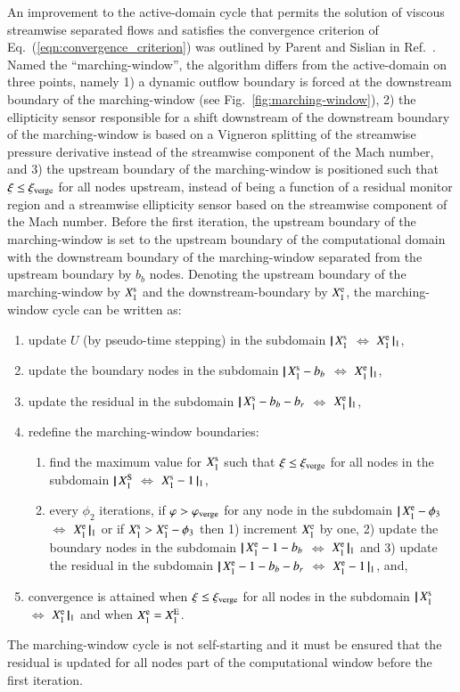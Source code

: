 \documentclass{warpdoc}
\newcommand{\bb}{{b_b}}
\newcommand{\br}{{b_r}}
\newcommand{\loope}{{\rm e}}
\newcommand{\loops}{{\rm s}}
\newcommand{\loopE}{{\rm E}}
\newcommand{\loopS}{{\rm S}}
\newcommand{\xiverge}{{\xi_{\rm verge}}}
\newcommand{\varphiverge}{{\varphi_{\rm verge}}}
\newcommand\subdomain[3]{$ | \! | \, #2 $ $\Leftrightarrow$ $#3 \, | \! |_{#1}$}
\begin{document}
An improvement to the active-domain cycle
that permits the solution of viscous streamwise separated flows and satisfies the
convergence criterion of Eq.~(\ref{eqn:convergence_criterion}) was outlined by Parent and Sislian in Ref.\ \cite{jcp:2002:parent}.
Named the ``marching-window'', the algorithm differs from the active-domain
on three points, namely 1) a dynamic outflow boundary is forced at the downstream
boundary of the marching-window (see Fig.~\ref{fig:marching-window}),
2) the ellipticity sensor responsible for a shift downstream of the downstream
boundary of the marching-window is based on a Vigneron splitting of the streamwise
pressure derivative instead of the streamwise component of the Mach number,
and 3) the upstream boundary of the marching-window is positioned
such that $\xi \leq \xiverge$ for all nodes upstream, instead of being
a function of a residual monitor region and a streamwise ellipticity sensor based on the streamwise component of
the Mach number.
Before the first iteration, the upstream boundary of the marching-window is set to the upstream
boundary of the computational
domain with the downstream boundary of the marching-window
separated from the upstream boundary by $\bb$ nodes.
Denoting the upstream boundary of the marching-window by $X_1^{\loops}$
and the downstream-boundary by $X_1^{\loope}$, the marching-window cycle can
be written as:
%
\begin{enumerate}
  \item{update $U$ (by pseudo-time stepping) in the subdomain \subdomain{1}{X^{\loops}_1}{X^{\loope}_1},}
  \item{update the boundary nodes in the subdomain \subdomain{1}{X^{\loops}_1-\bb}{X^{\loope}_1},}
  \item{update the residual in the subdomain \subdomain{1}{X^{\loops}_1-\bb-\br}{X^{\loope}_1},}
  \item{redefine the marching-window boundaries:}
  \begin{enumerate}
  \item{find the maximum value for $X_1^{\loops}$
        such that $\xi \leq \xiverge$ for all nodes in the
	subdomain \subdomain{1}{X_1^\loopS}{X_1^{\loops}-1},}
  \item{every $\phi_2$ iterations, if $\varphi>\varphiverge$ for any node in the
        subdomain \subdomain{1}{X^{\loope}_1-\phi_3}{X^{\loope}_1} or
	if $X_1^{\loops}>X_1^{\loope}-\phi_3$
        then 1) increment $X_1^{\loope}$ by one,
        2) update the boundary nodes in the subdomain \subdomain{1}{X^{\loope}_1-1-\bb}{X^{\loope}_1}
        and 3) update the residual in the subdomain \subdomain{1}{X^{\loope}_1-1-\bb-\br}{X^{\loope}_1-1},
	and,}
  \end{enumerate}
  \item{convergence is attained when $\xi \leq \xiverge$ for all nodes in the subdomain \subdomain{1}{X^{\loops}_1}{X^{\loope}_1}
        and when $X^{\loope}_1=X^{\loopE}_1$.}
\end{enumerate}
%
The marching-window cycle is not self-starting and it must be ensured that the residual is
updated for all nodes part of the computational window before the first iteration.
\end{document}
